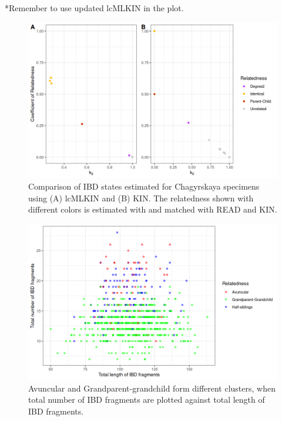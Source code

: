 \documentclass[12pt, letterpaper]{article}
\begin{document}
*Remember to use updated lcMLKIN in the plot.
\begin{figure}[h!]
    \centering
    \includegraphics[width=18cm]{supplementary_info/plots/lcPlot.png}
    \caption{Comparison of IBD states estimated for Chagyrskaya specimens using (A) lcMLKIN and (B) KIN.
    The relatedness shown with different colors is estimated with and matched with READ and KIN.}
    \label{figS6:Chagyrskaya_ibd}
\end{figure}


\begin{figure}[h!]
    \centering
    \includegraphics[width=18cm]{supplementary_info/plots/degree2_10Mwin.png}
    \caption{Avuncular and Grandparent-grandchild form different clusters, when total number of IBD fragments are plotted against total length of IBD fragments.}
    \label{figS7:second_degree}
\end{figure}
\end{document}
